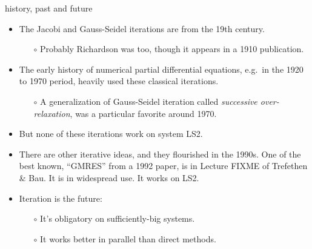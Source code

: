 \documentclass[10pt,hyperref]{beamer}
\begin{document}
\begin{frame}{history, past and future}

\begin{itemize}
\item The Jacobi and Gauss-Seidel iterations are from the 19th century.
  \begin{itemize}
  \item[$\circ$] Probably Richardson was too, though it appears in a 1910 publication.
  \end{itemize}
\item The early history of numerical partial differential equations, e.g.~in the 1920 to 1970 period, heavily used these classical iterations.
  \begin{itemize}
  \item[$\circ$] A generalization of Gauss-Seidel iteration called \emph{successive over-relaxation}, was a particular favorite around 1970.
  \end{itemize}
\item But none of these iterations work on system LS2.
\item There are other iterative ideas, and they flourished in the 1990s.  One of the best known, ``GMRES'' from a 1992 paper, is in Lecture FIXME of Trefethen \& Bau.  It is in widespread use.  It works on LS2.
\item Iteration is the future:
  \begin{itemize}
  \item[$\circ$] It's obligatory on sufficiently-big systems.
  \item[$\circ$] It works better in parallel than direct methods.
  \end{itemize}
\end{itemize}
\end{frame}
\end{document}

